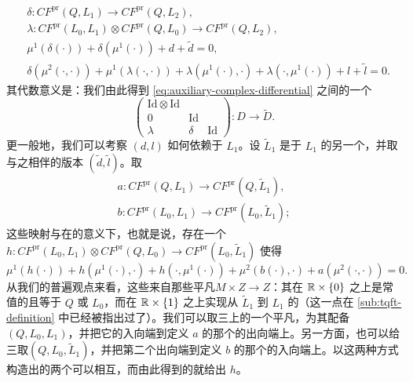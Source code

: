 \begin{equation*}
\boxed{\begin{aligned}
&\delta\colon CF^{\mathrm{pr}}(Q,L_1)\longrightarrow CF^{\mathrm{pr}}(Q,L_2),\\
&\lambda\colon CF^{\mathrm{pr}}(L_0,L_1)\otimes CF^{\mathrm{pr}}(Q,L_0)\longrightarrow CF^{\mathrm{pr}}(Q,L_2),\\
&\mu^1(\delta(\cdot))+\delta(\mu^1(\cdot))+d+\tilde{d}=0,\\
&\delta(\mu^2(\cdot,\cdot))+\mu^1(\lambda(\cdot,\cdot))+\lambda(\mu^1(\cdot),\cdot)+\lambda(\cdot,\mu^1(\cdot))+l+\tilde{l}=0.
\end{aligned}}
\end{equation*}
其代数意义是：我们由此得到\trChainComplex{} \eqref{eq:auxiliary-complex-differential} 之间的一个\trIsomorphism
\begin{equation}\label{eq:chain-complex-isomorphism-17f}
\begin{pmatrix}
\mathrm{Id}\otimes\mathrm{Id} & & \\
0 & \mathrm{Id} & \\
\lambda & \delta & \mathrm{Id}
\end{pmatrix}
\colon D\longrightarrow\tilde{D}.
\end{equation}
更一般地，我们可以考察 $(d,l)$ 如何依赖于 $L_1$。设 $\tilde{L}_1$ 是\trIsotopy{}于 $L_1$ 的另一个\trSubmanifold，并取与之相伴的版本 $(\tilde{d},\tilde{l})$。取\trContinuationMap
\begin{equation*}
\begin{gathered}
a\colon CF^{\mathrm{pr}}(Q,L_1)\longrightarrow CF^{\mathrm{pr}}(Q,\tilde{L}_1),\\
b\colon CF^{\mathrm{pr}}(L_0,L_1)\longrightarrow CF^{\mathrm{pr}}(L_0,\tilde{L}_1);
\end{gathered}
\end{equation*}
这些映射与\trTriangleProduct{}在\trChainHomotopy{}的意义下\trCompatible，也就是说，存在一个 $h\colon CF^{\mathrm{pr}}(L_0,L_1)\otimes CF^{\mathrm{pr}}(Q,L_0)\to CF^{\mathrm{pr}}(L_0,\tilde{L}_1)$ 使得
\begin{equation*}
\mu^1(h(\cdot))+h(\mu^1(\cdot),\cdot)+h(\cdot,\mu^1(\cdot))+\mu^2(b(\cdot),\cdot)+a(\mu^2(\cdot,\cdot))=0.
\end{equation*}
从我们的普遍观点来看，这些\trContinuationMap{}来自那些平凡\trFibration{}$M\times Z\to Z$：其\trBoundaryCondition{}在 $\mathbb{R}\times\{0\}$ 之上是常值的且等于 $Q$ 或 $L_0$，而在 $\mathbb{R}\times\{1\}$ 之上实现从 $\tilde{L}_1$ 到 $L_1$ 的\trIsotopy（这一点在 \cref{sub:tqft-definition} 中已经被指出过了）。我们可以取三\trPointedDisc{}上的一个平凡\trFibration，为其配备\trBoundaryCondition{}$(Q,L_0,L_1)$，并把它的入向端\trGluing{}到定义 $a$ 的那个\trFibration{}的出向端上。另一方面，也可以给三\trPointedDisc{}取\trBoundaryCondition{}$(Q,L_0,\tilde{L}_1)$，并把第二个出向端\trGluing{}到定义 $b$ 的那个\trFibration{}的入向端上。以这两种方式构造出的两个\trFibration{}可以相互\trDeformation，而由此得到的\trFamily{}就给出 $h$。
